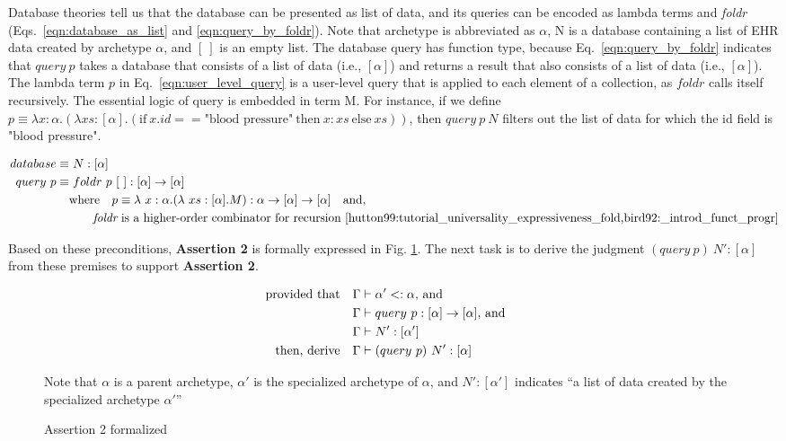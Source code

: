 \documentclass[preprint,3p,onecolumn,times,review]{elsarticle}
\begin{document}
Database theories \cite{hillebrand96:_datab_query_languag_embed_typed_lambd_calcul,grust99:_compr_queries,grust99:_how_compr_queries_funct,poulovassilis96:_algeb} tell us that the database can be presented as list of data, and its queries can be encoded as lambda terms and {\it foldr} (Eqs.~\ref{eqn:database_as_list} and \ref{eqn:query_by_foldr}).
Note that archetype is abbreviated as $\alpha$, N is a database containing a list of EHR data created by archetype $\alpha$, and $[~]$ is an empty list.
The database query has function type, because Eq.~\ref{eqn:query_by_foldr} indicates that $query~p$ takes a database that consists of a list of data (i.e., $[\alpha]$) and returns a result that also consists of a list of data (i.e., $[\alpha]$). The lambda term $p$ in Eq.~\ref{eqn:user_level_query} is a user-level query that is applied to each element of a collection, as $foldr$ calls itself recursively. The essential logic of query is embedded in term M. For instance, if we define $p \equiv \lambda x:\alpha.(\lambda xs:[\alpha].(\text{if}~ x.id == \text{"blood~pressure"} ~\text{then}~ x:xs ~\text{else}~ xs))$, then $query~p~N$ filters out the list of data for which the id field is "blood pressure".

\begin{alignat}{3}
   database \equiv & ~ N : [\alpha] \label{eqn:database_as_list}\\
   query~p  \equiv & ~ foldr~ p ~[~] : [\alpha] \rightarrow [\alpha] \label{eqn:query_by_foldr}\\
           & \text{where}  \quad   p \equiv \lambda~x:\alpha.(\lambda~xs:[\alpha].M) : \alpha \rightarrow [\alpha] \rightarrow [\alpha] \label{eqn:user_level_query} \quad \text{and,}\\
                  & \qquad   \text{{\it foldr} is a higher-order combinator for recursion \cite{hutton99:tutorial_universality_expressiveness_fold,bird92:_introd_funct_progr}} \nonumber
\end{alignat}


Based on these preconditions, {\bf Assertion 2} is formally expressed in Fig. \ref{fig:formalized_second_assertion}. The next task is to derive the judgment $(query~p)~N' :[\alpha] $ from these premises to support {\bf Assertion 2}.

\begin{figure}[!htbp]
\begin{alignat}{3}
  \text{provided that\quad}   & \Gamma \vdash \alpha' <: \alpha \text{, and}~ \\
                              & \Gamma \vdash query~p:[\alpha] \rightarrow [\alpha]\text{, and}~ \\
                              & \Gamma \vdash  N':[\alpha'] \\
  \text{then, derive\quad} & \Gamma \vdash (query~p)~N' :[\alpha] ~ & 
\end{alignat}\caption{Assertion 2 formalized}\label{fig:formalized_second_assertion}
Note that $\alpha$ is a parent archetype, $\alpha'$ is the specialized archetype of $\alpha$, and $N' : [\alpha']$ indicates ``a list of data created by the specialized archetype $\alpha'$''
\end{figure}
\end{document}
